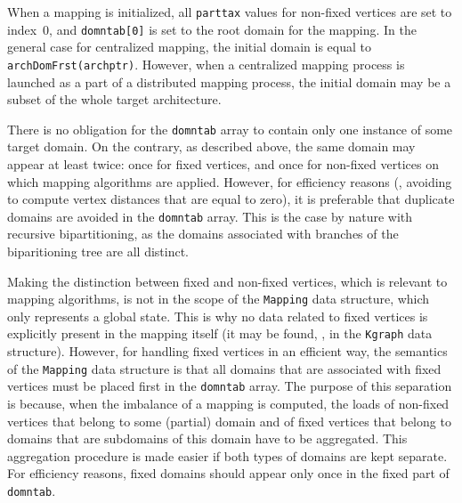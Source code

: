 When a mapping is initialized, all \texttt{parttax} values for
non-fixed vertices are set to index~$0$, and \texttt{domntab[0]} is
set to the root domain for the mapping. In the general case for
centralized mapping, the initial domain is equal to
\texttt{archDomFrst(archptr)}. However, when a centralized mapping
process is launched as a part of a distributed mapping process, the
initial domain may be a subset of the whole target architecture.

There is no obligation for the \texttt{domntab} array to contain only
one instance of some target domain. On the contrary, as described
above, the same domain may appear at least twice: once for fixed
vertices, and once for non-fixed vertices on which mapping algorithms
are applied. However, for efficiency reasons (\eg, avoiding to compute
vertex distances that are equal to zero), it is preferable that
duplicate domains are avoided in the \texttt{domntab} array. This is
the case by nature with recursive bipartitioning, as the domains
associated with branches of the biparitioning tree are all distinct.

Making the distinction between fixed and non-fixed vertices, which is
relevant to mapping algorithms, is not in the scope of the
\texttt{Mapping} data structure, which only represents a global
state. This is why no data related to fixed vertices is explicitly
present in the mapping itself (it may be found, \eg, in the
\texttt{Kgraph} data structure).
However, for handling fixed vertices in an efficient way, the
semantics of the \texttt{Mapping} data structure is that all domains
that are associated with fixed vertices must be placed first in the
\texttt{domntab} array. The purpose of this separation is because,
when the imbalance of a mapping is computed, the loads of non-fixed
vertices that belong to some (partial) domain and of fixed vertices
that belong to domains that are subdomains of this domain have to be
aggregated. This aggregation procedure is made easier if both types of
domains are kept separate. For efficiency reasons, fixed domains
should appear only once in the fixed part of \texttt{domntab}.
\\

